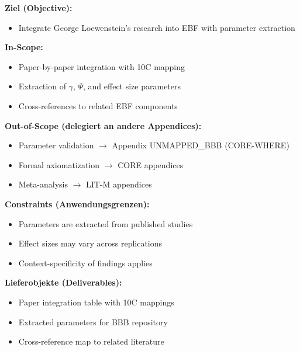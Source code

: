 
\begin{tcolorbox}[
    colback=orange!5!white,
    colframe=orange!75!black,
    title={\textbf{Appendix Scope: Ziel / In-Scope / Out-of-Scope / Constraints}},
    fonttitle=\bfseries
]

\textbf{Ziel (Objective):}
\begin{itemize}[nosep]
    \item Integrate George Loewenstein's research into EBF with parameter extraction
\end{itemize}

\textbf{In-Scope:}
\begin{itemize}[nosep]
    \item Paper-by-paper integration with 10C mapping
    \item Extraction of $\gamma$, $\Psi$, and effect size parameters
    \item Cross-references to related EBF components
\end{itemize}

\textbf{Out-of-Scope (delegiert an andere Appendices):}
\begin{itemize}[nosep]
    \item Parameter validation $\rightarrow$ Appendix UNMAPPED_BBB (CORE-WHERE)
    \item Formal axiomatization $\rightarrow$ CORE appendices
    \item Meta-analysis $\rightarrow$ LIT-M appendices
\end{itemize}

\textbf{Constraints (Anwendungsgrenzen):}
\begin{itemize}[nosep]
    \item Parameters are extracted from published studies
    \item Effect sizes may vary across replications
    \item Context-specificity of findings applies
\end{itemize}

\textbf{Lieferobjekte (Deliverables):}
\begin{itemize}[nosep]
    \item Paper integration table with 10C mappings
    \item Extracted parameters for BBB repository
    \item Cross-reference map to related literature
\end{itemize}

\end{tcolorbox}

